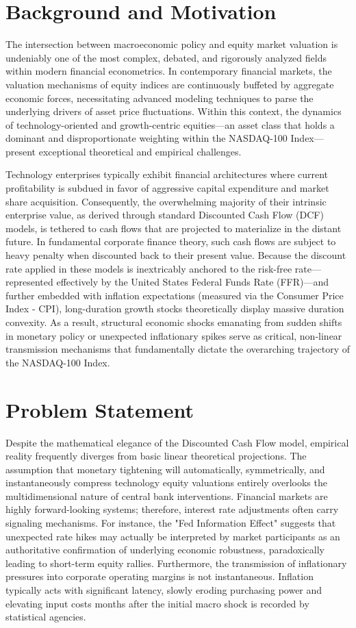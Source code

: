 \documentclass[12pt,a4paper]{report}
\begin{document}
\section{Background and Motivation}
The intersection between macroeconomic policy and equity market valuation is undeniably one of the most complex, debated, and rigorously analyzed fields within modern financial econometrics. In contemporary financial markets, the valuation mechanisms of equity indices are continuously buffeted by aggregate economic forces, necessitating advanced modeling techniques to parse the underlying drivers of asset price fluctuations. Within this context, the dynamics of technology-oriented and growth-centric equities—an asset class that holds a dominant and disproportionate weighting within the NASDAQ-100 Index—present exceptional theoretical and empirical challenges. 

Technology enterprises typically exhibit financial architectures where current profitability is subdued in favor of aggressive capital expenditure and market share acquisition. Consequently, the overwhelming majority of their intrinsic enterprise value, as derived through standard Discounted Cash Flow (DCF) models, is tethered to cash flows that are projected to materialize in the distant future. In fundamental corporate finance theory, such cash flows are subject to heavy penalty when discounted back to their present value. Because the discount rate applied in these models is inextricably anchored to the risk-free rate---represented effectively by the United States Federal Funds Rate (FFR)---and further embedded with inflation expectations (measured via the Consumer Price Index - CPI), long-duration growth stocks theoretically display massive duration convexity. As a result, structural economic shocks emanating from sudden shifts in monetary policy or unexpected inflationary spikes serve as critical, non-linear transmission mechanisms that fundamentally dictate the overarching trajectory of the NASDAQ-100 Index.

\section{Problem Statement}
Despite the mathematical elegance of the Discounted Cash Flow model, empirical reality frequently diverges from basic linear theoretical projections. The assumption that monetary tightening will automatically, symmetrically, and instantaneously compress technology equity valuations entirely overlooks the multidimensional nature of central bank interventions. Financial markets are highly forward-looking systems; therefore, interest rate adjustments often carry signaling mechanisms. For instance, the "Fed Information Effect" suggests that unexpected rate hikes may actually be interpreted by market participants as an authoritative confirmation of underlying economic robustness, paradoxically leading to short-term equity rallies. Furthermore, the transmission of inflationary pressures into corporate operating margins is not instantaneous. Inflation typically acts with significant latency, slowly eroding purchasing power and elevating input costs months after the initial macro shock is recorded by statistical agencies.
\end{document}
